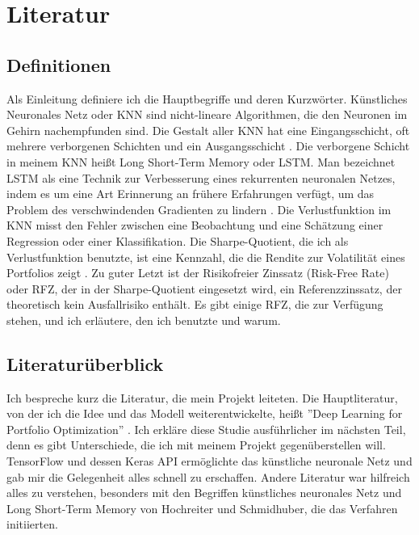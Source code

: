 \documentclass[12pt]{article}
\begin{document}
    \newpage \section{Literatur}

        \subsection{Definitionen}

            Als Einleitung definiere ich die Hauptbegriffe und deren Kurzwörter. 
            Künstliches Neuronales Netz oder KNN sind nicht-lineare Algorithmen, 
            die den Neuronen im Gehirn nachempfunden sind. 
            Die Gestalt aller KNN hat eine Eingangsschicht, 
            oft mehrere verborgenen Schichten und ein Ausgangsschicht \cite{bishop1995}. 
            Die verborgene Schicht in meinem KNN heißt Long Short-Term Memory oder
            LSTM. Man bezeichnet LSTM als eine Technik zur Verbesserung eines rekurrenten neuronalen Netzes,
            indem es um eine Art Erinnerung an frühere Erfahrungen verfügt, 
            um das Problem des verschwindenden Gradienten zu lindern \cite{hochreiter1997}. 
            Die Verlustfunktion im KNN misst den Fehler zwischen eine Beobachtung und eine Schätzung einer Regression oder einer Klassifikation. 
            Die Sharpe-Quotient, die ich als Verlustfunktion benutzte, 
            ist eine Kennzahl, die die Rendite zur Volatilität eines Portfolios zeigt \cite{sharpe1994}. 
            Zu guter Letzt ist der Risikofreier Zinssatz (Risk-Free Rate) oder RFZ,
            der in der Sharpe-Quotient eingesetzt wird, ein Referenzzinssatz, 
            der theoretisch kein Ausfallrisiko enthält. Es gibt einige RFZ, die zur Verfügung stehen,
            und ich erläutere, den ich benutzte und warum.
        
        \subsection{Literaturüberblick}
        
            Ich bespreche kurz die Literatur, die mein Projekt leiteten. 
            Die Hauptliteratur, von der ich die Idee und das Modell weiterentwickelte, 
            heißt ''Deep Learning for Portfolio Optimization'' \cite{zhang2020}. 
            Ich erkläre diese Studie ausführlicher im nächsten Teil, denn es gibt Unterschiede, 
            die ich mit meinem Projekt gegenüberstellen will. TensorFlow \cite{tensorflow2016} und 
            dessen Keras API \cite{chollet2015-keras} ermöglichte das künstliche neuronale Netz und 
            gab mir die Gelegenheit alles schnell zu erschaffen. 
            Andere Literatur war hilfreich alles zu verstehen, besonders mit den Begriffen künstliches neuronales Netz \cite{bishop1995}
            und Long Short-Term Memory von Hochreiter und Schmidhuber, die das Verfahren initiierten.
\end{document}
